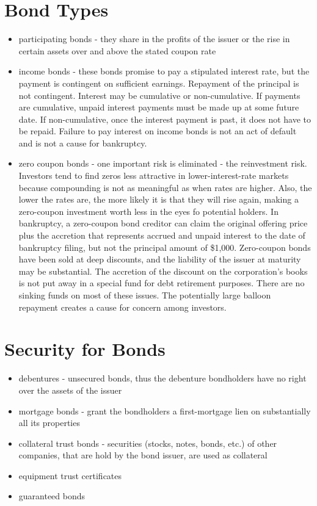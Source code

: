 \section{Bond Types}
\begin{itemize}
	\item participating bonds - they share in the profits of the issuer or the rise in certain assets over and above the stated coupon rate
	\item income bonds - these bonds promise to pay a stipulated interest rate, but the payment is contingent on sufficient earnings. Repayment of the principal is not contingent. Interest may be cumulative or non-cumulative. If payments are cumulative, unpaid interest payments must be made up at some future date. If non-cumulative, once the interest payment is past, it does not have to be repaid. Failure to pay interest on income bonds is not an act of default and is not a cause for bankruptcy.
	\item zero coupon bonds - one important risk is eliminated - the reinvestment risk. Investors tend to find zeros less attractive in lower-interest-rate markets because compounding is not as meaningful as when rates are higher. Also, the lower the rates are, the more likely it is that they will rise again, making a zero-coupon investment worth less in the eyes fo potential holders. In bankruptcy, a zero-coupon bond creditor can claim the original offering price plus the accretion that represents accrued and unpaid interest to the date of bankruptcy filing, but not the principal amount of \$1,000. Zero-coupon bonds have been sold at deep discounts, and the liability of the issuer at maturity may be substantial. The accretion of the discount on the corporation's books is not put away in a special fund for debt retirement purposes. There are no sinking funds on most of these issues. The potentially large balloon repayment creates a cause for concern among investors.
\end{itemize}

\section{Security for Bonds}
\begin{itemize}
	\item debentures - unsecured bonds, thus the debenture bondholders have no right over the assets of the issuer
	\item mortgage bonds - grant the bondholders a first-mortgage lien on substantially all its properties
	\item collateral trust bonds - securities (stocks, notes, bonds, etc.) of other companies, that are hold by the bond issuer, are used as collateral
	\item equipment trust certificates
	\item guaranteed bonds
\end{itemize}

